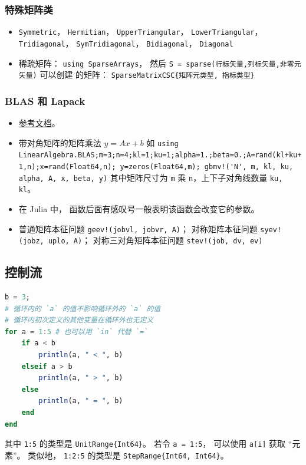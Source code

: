 \subsubsection{特殊矩阵类}
\begin{itemize}
\item \verb`Symmetric`， \verb`Hermitian`， \verb`UpperTriangular`， \verb`LowerTriangular`， \verb`Tridiagonal`， \verb`SymTridiagonal`， \verb`Bidiagonal`， \verb`Diagonal`
\item 稀疏矩阵： \verb`using SparseArrays`， 然后 \verb`S = sparse(行标矢量,列标矢量,非零元矢量)` 可以创建 的矩阵： \verb`SparseMatrixCSC{矩阵元类型, 指标类型}`
\end{itemize}

\subsubsection{BLAS 和 Lapack}
\begin{itemize}
\item \href{https://docs.julialang.org/en/v1/stdlib/LinearAlgebra/}{参考文档}。
\item 带对角矩阵的矩阵乘法 $y = Ax+b$ 如 \verb`using LinearAlgebra.BLAS;m=3;n=4;kl=1;ku=1;alpha=1.;beta=0.;A=rand(kl+ku+1,n);x=rand(Float64,n); y=zeros(Float64,m); gbmv!('N', m, kl, ku, alpha, A, x, beta, y)` 其中矩阵尺寸为 \verb`m` 乘 \verb`n`，上下子对角线数量 \verb`ku, kl`。
\item 在 Julia 中， 函数后面有感叹号一般表明该函数会改变它的参数。
\item 普通矩阵本征问题 \verb`geev!(jobvl, jobvr, A)`； 对称矩阵本征问题 \verb`syev!(jobz, uplo, A)`； 对称三对角矩阵本征问题 \verb`stev!(job, dv, ev)`
\end{itemize}


\subsection{控制流}
\begin{lstlisting}[language=Julia]
b = 3;
# 循环内的 `a` 的值不影响循环外的 `a` 的值
# 循环内初次定义的其他变量在循环外也无定义
for a = 1:5 # 也可以用 `in` 代替 `=`
    if a < b
        println(a, " < ", b)
    elseif a > b
        println(a, " > ", b)
    else
        println(a, " = ", b)
    end
end
\end{lstlisting}
其中 \verb`1:5` 的类型是 \verb`UnitRange{Int64}`。 若令 \verb`a = 1:5`， 可以使用 \verb`a[i]` 获取 “元素”。 类似地， \verb`1:2:5` 的类型是 \verb`StepRange{Int64, Int64}`。

